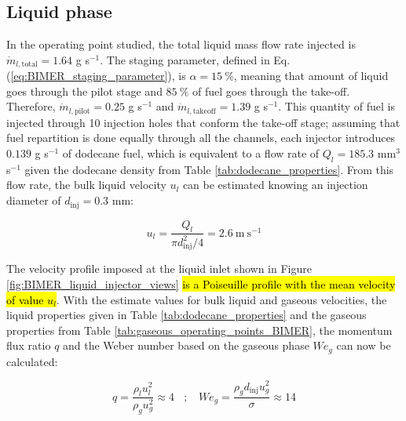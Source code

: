 \subsection{Liquid phase}

In the operating point studied, the total liquid mass flow rate injected is $\dot{m}_{l,\mathrm{total}} = 1.64$ g s$^{-1}$. The staging parameter, defined in Eq. (\ref{eq:BIMER_staging_parameter}), is $\alpha = 15 ~\%$, meaning that amount of liquid goes through the pilot stage and $85 ~\%$ of fuel goes through the take-off. Therefore, $\dot{m}_{l,\mathrm{pilot}} = 0.25$ g s$^{-1}$ and $\dot{m}_{l,\mathrm{takeoff}} = 1.39$ g s$^{-1}$. This quantity of fuel is injected through 10 injection holes that conform the take-off stage; assuming that fuel repartition is done equally through all the channels, each injector introduces $0.139$ g s$^{-1}$ of dodecane fuel, which is equivalent to a flow rate of $Q_l = 185.3$  mm$^3$ s$^{-1}$ given the dodecane density from Table \ref{tab:dodecane_properties}. From this flow rate, the bulk liquid velocity $u_l$ can be estimated knowing an injection diameter of $d_\mathrm{inj} = 0.3$ mm:

\begin{equation}
u_l = \frac{Q_l}{\pi d_\mathrm{inj}^2 / 4} = 2.6 ~ \mathrm{m} ~ \mathrm{s}^{-1}
\end{equation}


The velocity profile imposed at the liquid inlet shown in Figure \ref{fig:BIMER_liquid_injector_views} \hl{is a Poiseuille profile with the mean velocity of value $u_l$}. With the estimate values for bulk liquid and gaseous velocities, the liquid properties given in Table \ref{tab:dodecane_properties} and the gaseous properties from Table \ref{tab:gaseous_operating_points_BIMER}, the momentum flux ratio $q$ and the Weber number based on the gaseous phase $We_g$ can now be calculated:


\begin{equation}
q =  \frac{\rho_l u_l^2}{\rho_g u_g^2} \approx 4 ~~~~ ; ~~~~  We_g =  \frac{\rho_g d_\mathrm{inj} u_g^2}{\sigma} \approx 14
\end{equation}

